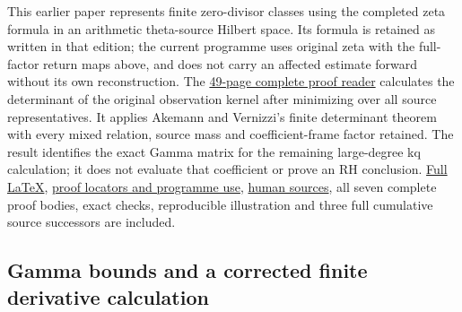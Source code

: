 \documentclass[
]{article}
\begin{document}
This earlier paper represents finite zero-divisor classes using the
completed zeta formula in an arithmetic theta-source Hilbert space. Its
formula is retained as written in that edition; the current programme
uses original zeta with the full-factor return maps above, and does not
carry an affected estimate forward without its own reconstruction. The
\href{https://github.com/KokunoYumeto/zeta-function-research-reader/blob/main/workbenches/splitzero-tandem/continuations/20260920-original-kernel-mixed-determinants/COMPLETE_PROOFS.pdf}{49-page
complete proof reader} calculates the determinant of the original
observation kernel after minimizing over all source representatives. It
applies Akemann and Vernizzi's finite determinant theorem with every
mixed relation, source mass and coefficient-frame factor retained. The
result identifies the exact Gamma matrix for the remaining large-degree
kq calculation; it does not evaluate that coefficient or prove an RH
conclusion.
\href{https://github.com/KokunoYumeto/zeta-function-research-reader/blob/main/workbenches/splitzero-tandem/continuations/20260920-original-kernel-mixed-determinants/COMPLETE_PROOFS.tex}{Full
LaTeX},
\href{https://github.com/KokunoYumeto/zeta-function-research-reader/blob/main/workbenches/splitzero-tandem/continuations/20260920-original-kernel-mixed-determinants/RESULT_INDEX.json}{proof
locators and programme use},
\href{https://github.com/KokunoYumeto/zeta-function-research-reader/blob/main/workbenches/splitzero-tandem/continuations/20260920-original-kernel-mixed-determinants/SOURCE_USE_LEDGER.json}{human
sources}, all seven complete proof bodies, exact checks, reproducible
illustration and three full cumulative source successors are included.

\subsection{Gamma bounds and a corrected finite derivative
calculation}\label{gamma-bounds-and-a-corrected-finite-derivative-calculation}
\end{document}
